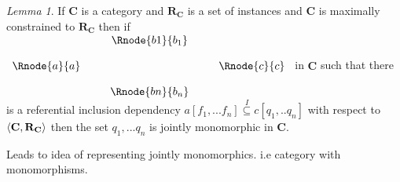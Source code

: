 \documentclass[10pt,a4paper]{article}
\theoremstyle{remark}
\newtheorem*{lemma*}{Lemma}
\newcommand{\catc}[1][C]{\textbf{#1}}
\newcommand{\reqt}{\textbf{R}}
\newcommand{\reqtc}[1][\catc]{\reqt_{#1}}
\newcommand{\Po}{\ensuremath{\textbf{Po}} }
\begin{document}
\begin{lemma*}
If $\catc$ is a category and $\reqtc$ is a set of instances and $\catc$ is maximally constrained to $\reqtc$
then if 
$
\begin{array}{c p{0.25cm} c  p{0.25cm} c }
             &&   \Rnode{b1}{b_1} &&              \\[0.4cm]
\Rnode{a}{a} &&                   && \Rnode{c}{c} \\[0.4cm]
             &&   \Rnode{bn}{b_n} &&              
\end{array} 
$
in $\catc$ such that there is a referential inclusion dependency $a[f_1,...f_n] \overset{I}{\subseteq} c[q_1,..q_n]$ with respect to $\tuple{\catc,\reqtc}$ then the set $q_1,...q_n$ is jointly monomorphic in $\catc$.
\end{lemma*}




Leads to idea of representing jointly monomorphics. i.e category with monomorphisms.

\iffalse
\section*{Data Specification as Presentation of Category with  Monomorphisms}
\section*{Data Specification as Presentation of Category with Products and Monomorphisms}
\section*{Data Specification as Presentation of Category with Limits (and Monomorphisms)}
\section*{Data Specification as Presentation of $\Po$-enriched Category}
\fi
 

\end{document}
